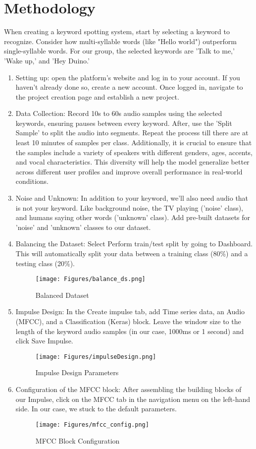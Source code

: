 \documentclass{article}
\begin{document}
\section{Methodology}
\label{sec:methodology}
When creating a keyword spotting system, start by selecting a keyword to recognize. Consider how multi-syllable words (like "Hello world") outperform single-syllable words. For our group, the selected keywords are 'Talk to me,' 'Wake up,' and 'Hey Duino.'

\begin{enumerate}
  \item Setting up: open the platform's website and log in to your account. If you haven't already done so, create a new account. Once logged in, navigate to the project creation page and establish a new project.
  \item Data Collection: Record 10s to 60s audio samples using the selected keywords, ensuring pauses between every keyword. After, use the 'Split Sample' to split the audio into segments. Repeat the process till there are at least 10 minutes of samples per class. Additionally, it is crucial to ensure that the samples include a variety of speakers with different genders, ages, accents, and vocal characteristics. This diversity will help the model generalize better across different user profiles and improve overall performance in real-world conditions.
  \item Noise and Unknown: In addition to your keyword, we'll also need audio that is not your keyword. Like background noise, the TV playing ('noise' class), and humans saying other words ('unknown' class). Add pre-built datasets for 'noise' and 'unknown' classes to our dataset.
  \item Balancing the Dataset: Select Perform train/test split by going to Dashboard. This will automatically split your data between a training class (80\%) and a testing class (20\%).
    \begin{figure}[H]
        \centering
        \texttt{[image: Figures/balance\_ds.png]}
        \caption{Balanced Dataset}
        \label{fig:balancedt}
    \end{figure}
  \item Impulse Design: In the Create impulse tab, add Time series data, an Audio (MFCC), and a Classification (Keras) block. Leave the window size to the length of the keyword audio samples (in our case, 1000ms or 1 second) and click Save Impulse.
    \begin{figure}[H]
        \centering
        \texttt{[image: Figures/impulseDesign.png]}
        \caption{Impulse Design Parameters}
        \label{fig:impulse}
    \end{figure}
  \item Configuration of the MFCC block: After assembling the building blocks of our Impulse, click on the MFCC tab in the navigation menu on the left-hand side. In our case, we stuck to the default parameters.
    \begin{figure}[H]
        \centering
        \texttt{[image: Figures/mfcc\_config.png]}
        \caption{MFCC Block Configuration}
        \label{fig:mfcc}
    \end{figure}
    

\end{enumerate}
\end{document}
